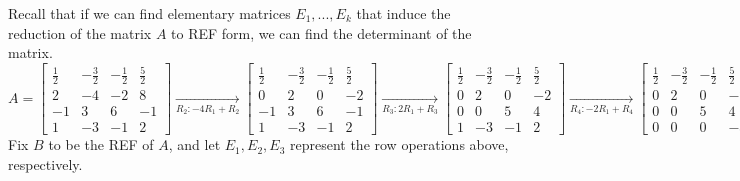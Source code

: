 \begin{SaveQuestion}
    
    Recall that if we can find elementary matrices $E_1, ..., E_k$ that induce the reduction of the matrix $A$ to REF form, we can find the determinant of the matrix. 
    $$A = \begin{bmatrix} \frac{1}{2} & -\frac{3}{2} & -\frac{1}{2} & \frac{5}{2} \\ 2 & -4 & -2 & 8 \\ -1 & 3 & 6 & -1 \\ 1 & -3 & -1 & 2 \end{bmatrix} \underset{R_2: -4R_1 + R_2}{\rightarrow} \begin{bmatrix} \frac{1}{2} & -\frac{3}{2} & -\frac{1}{2} & \frac{5}{2} \\ 0 & 2 & 0 & -2 \\ -1 & 3 & 6 & -1 \\ 1 & -3 & -1 & 2 \end{bmatrix} \underset{R_3: 2R_1 + R_3}{\rightarrow} \begin{bmatrix} \frac{1}{2} & -\frac{3}{2} & -\frac{1}{2} & \frac{5}{2} \\ 0 & 2 & 0 & -2 \\ 0 & 0 & 5 & 4 \\ 1 & -3 & -1 & 2 \end{bmatrix} \underset{R_4: -2R_1 + R_4}{\rightarrow} \begin{bmatrix} \frac{1}{2} & -\frac{3}{2} & -\frac{1}{2} & \frac{5}{2} \\ 0 & 2 & 0 & -2 \\ 0 & 0 & 5 & 4 \\ 0 & 0 & 0 & -3\end{bmatrix}$$
    Fix $B$ to be the REF of $A$, and let $E_1, E_2, E_3$ represent the row operations above, respectively.

\end{SaveQuestion}
